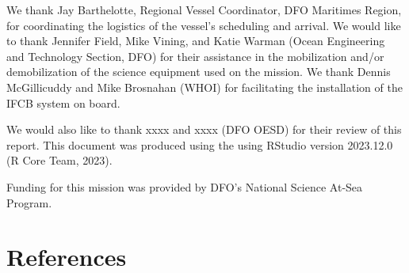 \documentclass[12pt]{article}\usepackage[]{graphicx}\usepackage[]{color}
\begin{document}
We thank Jay Barthelotte, Regional Vessel Coordinator, DFO Maritimes Region, for coordinating the logistics of the vessel's scheduling and arrival. We would like to thank Jennifer Field, Mike Vining, and Katie Warman (Ocean Engineering and Technology Section, DFO) for their assistance in the mobilization and/or demobilization of the science equipment used on the mission. We thank Dennis McGillicuddy and Mike Brosnahan (WHOI) for facilitating the installation of the IFCB system on board.

We would also like to thank xxxx and xxxx (DFO OESD) for their review of this report. This document was produced using the  using RStudio version 2023.12.0 (R Core Team, 2023).

Funding for this mission was provided by DFO's National Science At-Sea Program.

\clearpage

\section{References}\label{references}
\end{document}
